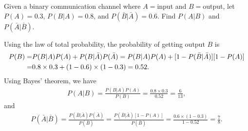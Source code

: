 \documentclass{assignment}
\begin{document}
\begin{prob}
    Given a binary communication channel where $A=$input and $B=$output, let $P(A)=0.3$, $P(B\vert A)=0.8$, and $P(\bar{B}\vert\bar{A})=0.6$. Find $P(A\vert B)$ and $P(\bar{A}\vert\bar{B})$.
\end{prob}
\begin{sol}
    Using the law of total probability, the probability of getting output $B$ is
    \begin{align}
        \notag P(B)=&P(B\vert A)P(A)+P(B\vert\bar{A})P(\bar{A})=P(B\vert A)P(A)+[1-P(\bar{B}\vert\bar{A})][1-P(A)]\\
        =&0.8\times 0.3+(1-0.6)\times(1-0.3)=0.52.
    \end{align}
    Using Bayes' theorem, we have
    \begin{align}
        P(A\vert B)=\frac{P(B\vert A)P(A)}{P(B)}=\frac{0.8\times 0.3}{0.52}=\frac{6}{13},
    \end{align}
    and
    \begin{align}
        P(\bar{A}\vert\bar{B})=\frac{P(\bar{B}\vert\bar{A})P(\bar{A})}{P(\bar{B})}=\frac{P(\bar{B}\vert\bar{A})[1-P(A)]}{P(\bar{B})}=\frac{0.6\times(1-0.3)}{1-0.52}=\frac{7}{8}.
    \end{align}
\end{sol}
\end{document}
